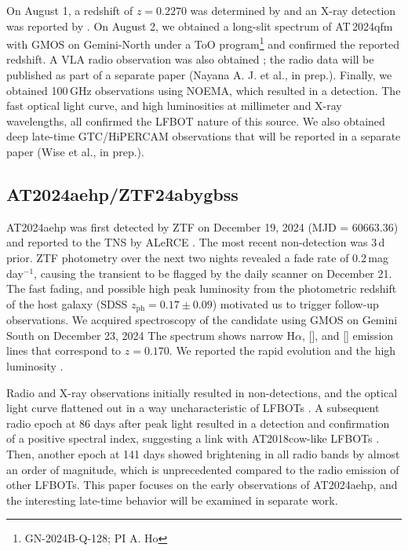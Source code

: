 \documentclass[twocolumn,twocolappendix, linenumbers, trackchanges]{aastex7}
\begin{document}
On August 1, a redshift of $z=0.2270$ was determined by \citet{Gillanders2024_AT2024qfm} and an X-ray detection was reported by \citet{Margutti2024_AT2024qfm}. On August 2, we obtained a long-slit spectrum of AT\,2024qfm with GMOS on Gemini-North under a ToO program\footnote{GN-2024B-Q-128; PI A. Ho} and confirmed the reported redshift. A VLA radio observation was also obtained 
; the radio data will be published as part of a separate paper (Nayana A. J. et al., in prep.). Finally, we obtained 100\,GHz observations using NOEMA, which resulted in a detection. The fast optical light curve, and high luminosities at millimeter and X-ray wavelengths, all confirmed the LFBOT nature of this source. We also obtained deep late-time GTC/HiPERCAM observations that will be reported in a separate paper (Wise et al., in prep.). 

\subsection{AT2024aehp/ZTF24abygbss}

AT2024aehp was first detected by ZTF on December 19, 2024 (MJD = 60663.36) and reported to the TNS by ALeRCE \citep{astro2024aehp_disc}. The most recent non-detection was 3\,d prior.  ZTF photometry over the next two nights revealed a fade rate of 0.2\,mag\,day$^{-1}$, causing the transient to be flagged by the daily scanner on December 21. The fast fading,  and possible high peak luminosity from the photometric redshift of the host galaxy (SDSS $z_\mathrm{ph} = 0.17 \pm 0.09$) motivated us to trigger follow-up observations. We acquired spectroscopy of the candidate using GMOS on Gemini South on December 23, 2024 %
The spectrum shows narrow H$\alpha$, [], and [] emission lines that correspond to $z=0.170$. We reported the rapid evolution and the high luminosity  \citep{astro2024aehp_gemini}. 

Radio and X-ray observations initially resulted in non-detections, and the optical light curve flattened out in a way uncharacteristic of LFBOTs \citep{Schroeder2025_AT2024aehp}. A subsequent radio epoch at 86 days after peak light resulted in a detection and confirmation of a positive spectral index, suggesting a link with AT2018cow-like LFBOTs \citep{Schroeder2025_AT2024aehp_Detection}.  Then, another epoch at 141 days showed brightening in all radio bands by almost an order of magnitude, which is unprecedented compared to the radio emission of other LFBOTs.  This paper focuses on the early observations of AT2024aehp, and the interesting late-time behavior will be examined in separate work.
\end{document}
